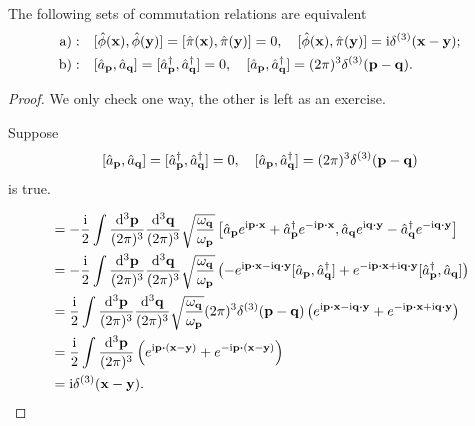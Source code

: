 \documentclass[a4paper,11pt]{article}
\begin{document}
	\begin{thm}
		The following sets of commutation relations are equivalent
		\begin{align}
			\mathrm{a):} & \quad[\hat \phi(\vb x),\hat \phi(\vb y)] = [\hat \pi(\vb x), \hat \pi(\vb y)] = 0, \quad [\hat \phi(\vb x), \hat \pi(\vb y)] = \mathrm{i} \delta^{(3)}(\vb x - \vb y);\\
			\mathrm{b):} & \quad[\hat a _{\vb p}, \hat a _{\vb q}] = [\hat a^\dagger _{\vb p}, \hat a^\dagger _{\vb q}] = 0, \quad [\hat a _{\vb p}, \hat a^\dagger _{\vb q}] = (2 \pi)^3 \delta ^{(3)}(\vb p - \vb q).
		\end{align}
	\end{thm}
	\begin{proof}
		We only check one way, the other is left as an exercise.

		Suppose
		\[
			[\hat a _{\vb p}, \hat a _{\vb q}] = [\hat a^\dagger _{\vb p}, \hat a^\dagger _{\vb q}] = 0, \quad [\hat a _{\vb p}, \hat a^\dagger _{\vb q}] = (2 \pi)^3 \delta ^{(3)}(\vb p - \vb q)
		\]
		is true.

		\begin{align*}
			[\hat \phi(\vb x), \hat \pi(\vb y)] & = - \frac{\mathrm{i}}{2} \int \ddk{\vb p}{3} \ddk{\vb q}{3} \sqrt{\frac{\omega _{\vb q}}{\omega _{\vb p}}} \left[ \hat a _{\vb p}e ^{\mathrm{i} \vb p \vdot \vb x} + \hat a^\dagger _{\vb p} e ^{-\mathrm{i}\vb p \vdot \vb x}, \hat a _{\vb q} e ^{\mathrm{i} \vb q \vdot \vb y} - \hat a^\dagger _{\vb q} e ^{- \mathrm{i} \vb q \vdot \vb y} \right]\\
			& = - \frac{\mathrm{i}}{2} \int \ddk{\vb p}{3} \ddk{\vb q}{3} \sqrt{\frac{\omega _{\vb q}}{\omega _{\vb p}}} \left( - e ^{\mathrm{i} \vb p \vdot \vb x - \mathrm{i} \vb q \vdot \vb y} [\hat a _{\vb p}, \hat a^\dagger _{\vb q}] + e ^{-\mathrm{i} \vb p \vdot \vb x + \mathrm{i} \vb q \vdot \vb y} [\hat a^\dagger _{\vb p}, \hat a _{\vb q}] \right)\\
			& = \frac{\mathrm{i}}{2} \int \ddk{\vb p}{3} \ddk{\vb q}{3} \sqrt{\frac{\omega _{\vb q}}{\omega _{\vb p}}}(2 \pi)^3 \delta ^{(3)} (\vb p - \vb q) \left( e ^{\mathrm{i} \vb p \vdot \vb x - \mathrm{i} \vb q \vdot \vb y} + e ^{-\mathrm{i} \vb p \vdot \vb x + \mathrm{i} \vb q \vdot \vb y} \right)\\
			& = \frac{\mathrm{i}}{2}\int \ddk{\vb p}{3} \left( e ^{\mathrm{i} \vb p \vdot (\vb x - \vb y)} + e ^{-\mathrm{i} \vb p \vdot (\vb x - \vb y)} \right)\\
			& = \mathrm{i} \delta ^{(3)}(\vb x - \vb y).
		\end{align*}
	\end{proof}
\end{document}
